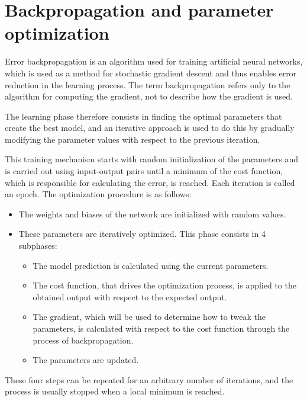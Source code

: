 \section{Backpropagation and parameter optimization} \label{backprop}
Error backpropagation is an algorithm used for training artificial neural networks, which is used as a method for stochastic gradient descent and thus enables error reduction in the learning process. The term backpropagation refers only to the algorithm for computing the gradient, not to describe how the gradient is used.

The learning phase therefore consists in finding the optimal parameters that create the best model, and an iterative approach is used to do this by gradually modifying the parameter values with respect to the previous iteration.

This training mechanism starts with random initialization of the parameters and is carried out using input-output pairs until a minimum of the cost function, which is responsible for calculating the error, is reached. Each iteration is called an epoch.
The optimization procedure is as follows:
\begin{itemize}
    \item The weights and biases of the network are initialized with random values.
    \item These parameters are iteratively optimized. This phase consists in 4 subphases:
    \begin{itemize}
        \item The model prediction is calculated using the current parameters.
        \item The cost function, that drives the optimization process, is applied to the obtained output with respect to the expected output.
        \item The gradient, which will be used to determine how to tweak the parameters, is calculated with respect to the cost function through the process of backpropagation.
        \item The parameters are updated. 
    \end{itemize}
\end{itemize}

These four steps can be repeated for an arbitrary number of iterations, and the process is usually stopped when a local minimum is reached.
\clearpage 
